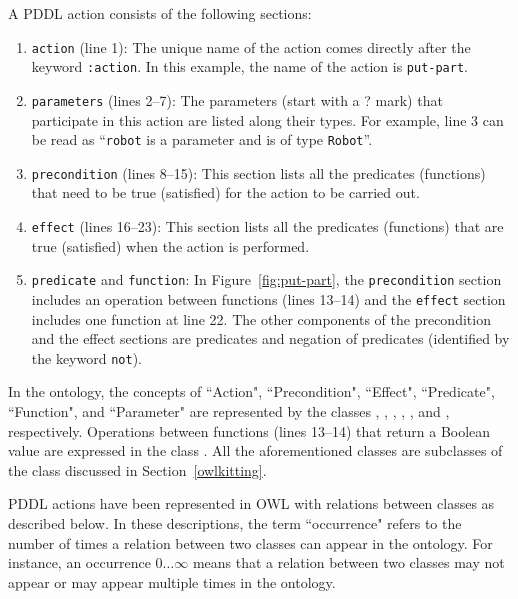 A PDDL action consists of the following sections:
\begin{enumerate}
  \item \texttt{action} (line 1): The unique name of the action comes directly after the keyword \texttt{:action}. In this example, the name of the action is \texttt{put-part}.
  \item \texttt{parameters} (lines 2--7): The parameters (start with a ? mark) that participate in this action are listed along their types. For example, line 3 can be read as ``\texttt{robot} is a parameter and is of type \texttt{Robot}''.
  \item \texttt{precondition} (lines 8--15): This section lists all the predicates (functions) that need to be true (satisfied) for the action to be carried out.
  \item \texttt{effect} (lines 16--23): This section lists all the predicates (functions) that are true (satisfied) when the action is performed.
  \item \texttt{predicate} and \texttt{function}: In Figure~\ref{fig:put-part}, the \texttt{precondition} section includes an operation between functions (lines 13--14) and the \texttt{effect} section includes one function at line 22. The other components of the precondition and the effect sections are predicates and negation of predicates (identified by the keyword \texttt{not}).
\end{enumerate}

In the  ontology, the concepts of ``Action", ``Precondition", ``Effect", ``Predicate", ``Function", and ``Parameter" are represented by the classes , , , , , and , respectively. Operations between functions (lines 13--14) that return a Boolean value are expressed in the class . All the aforementioned classes are subclasses of the  class discussed in Section~\ref{owlkitting}.

PDDL actions have been represented in OWL with relations between classes as described below. In these descriptions, the term ``occurrence" refers to the number of times a relation between two classes can appear in the ontology. For instance, an occurrence $0\ldots\infty$ means that a relation between two classes may not appear or may appear multiple times in the ontology.


